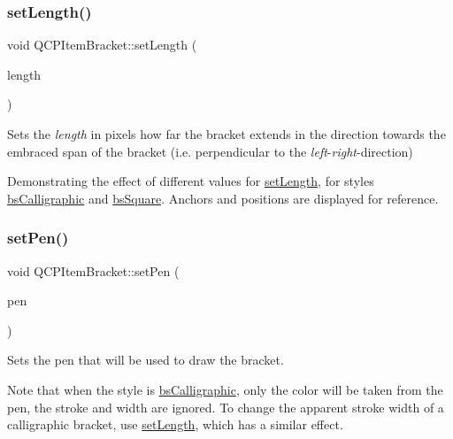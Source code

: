 \hypertarget{class_q_c_p_item_bracket_ac7cfc3da7da9b5c5ac5dfbe4f0351b2a}{}\label{class_q_c_p_item_bracket_ac7cfc3da7da9b5c5ac5dfbe4f0351b2a} 
\subsubsection{\texorpdfstring{set\+Length()}{setLength()}}
{\footnotesize\ttfamily void Q\+C\+P\+Item\+Bracket\+::set\+Length (\begin{DoxyParamCaption}\item[{double}]{length }\end{DoxyParamCaption})}

Sets the {\itshape length} in pixels how far the bracket extends in the direction towards the embraced span of the bracket (i.\+e. perpendicular to the {\itshape left}-\/{\itshape right}-\/direction)

 \begin{center}Demonstrating the effect of different values for \hyperlink{class_q_c_p_item_bracket_ac7cfc3da7da9b5c5ac5dfbe4f0351b2a}{set\+Length}, for styles \hyperlink{class_q_c_p_item_bracket_a7ac3afd0b24a607054e7212047d59dbda8f29f5ef754e2dc9a9efdedb2face0f3}{bs\+Calligraphic} and \hyperlink{class_q_c_p_item_bracket_a7ac3afd0b24a607054e7212047d59dbda7f9df4a7359bfe3dac1dbe4ccf5d220c}{bs\+Square}. Anchors and positions are displayed for reference.\end{center}  \hypertarget{class_q_c_p_item_bracket_ab13001d9cc5d8f9e56ea15bdda682acb}{}\label{class_q_c_p_item_bracket_ab13001d9cc5d8f9e56ea15bdda682acb} 
\subsubsection{\texorpdfstring{set\+Pen()}{setPen()}}
{\footnotesize\ttfamily void Q\+C\+P\+Item\+Bracket\+::set\+Pen (\begin{DoxyParamCaption}\item[{const Q\+Pen \&}]{pen }\end{DoxyParamCaption})}

Sets the pen that will be used to draw the bracket.

Note that when the style is \hyperlink{class_q_c_p_item_bracket_a7ac3afd0b24a607054e7212047d59dbda8f29f5ef754e2dc9a9efdedb2face0f3}{bs\+Calligraphic}, only the color will be taken from the pen, the stroke and width are ignored. To change the apparent stroke width of a calligraphic bracket, use \hyperlink{class_q_c_p_item_bracket_ac7cfc3da7da9b5c5ac5dfbe4f0351b2a}{set\+Length}, which has a similar effect.

